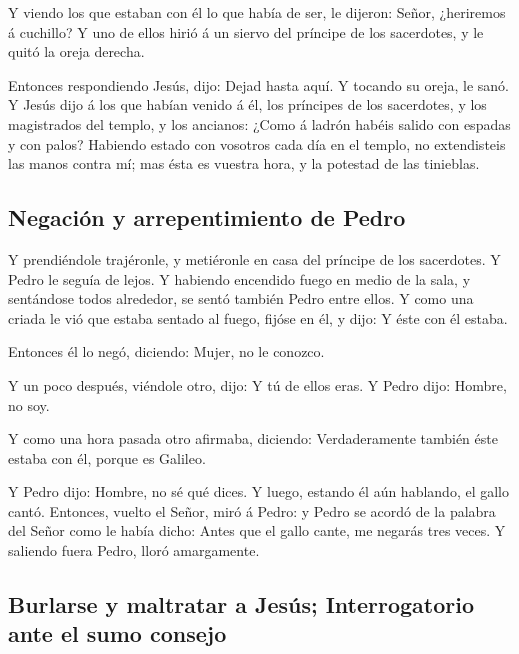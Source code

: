  Y viendo los que estaban con él lo que había de ser, le
dijeron: Señor, ¿heriremos á cuchillo?  Y uno de ellos
hirió á un siervo del príncipe de los sacerdotes, y le quitó la oreja
derecha.

 Entonces respondiendo Jesús, dijo: Dejad hasta aquí. Y
tocando su oreja, le sanó.  Y Jesús dijo á los que habían
venido á él, los príncipes de los sacerdotes, y los magistrados del
templo, y los ancianos: ¿Como á ladrón habéis salido con espadas y con
palos?  Habiendo estado con vosotros cada día en el
templo, no extendisteis las manos contra mí; mas ésta es vuestra hora, y
la potestad de las tinieblas.

\hypertarget{negaciuxf3n-y-arrepentimiento-de-pedro}{%
\subsection{Negación y arrepentimiento de
Pedro}\label{negaciuxf3n-y-arrepentimiento-de-pedro}}

 Y prendiéndole trajéronle, y metiéronle en casa del
príncipe de los sacerdotes. Y Pedro le seguía de lejos. 
Y habiendo encendido fuego en medio de la sala, y sentándose todos
alrededor, se sentó también Pedro entre ellos.  Y como
una criada le vió que estaba sentado al fuego, fijóse en él, y dijo: Y
éste con él estaba.

 Entonces él lo negó, diciendo: Mujer, no le conozco.

 Y un poco después, viéndole otro, dijo: Y tú de ellos
eras. Y Pedro dijo: Hombre, no soy.

 Y como una hora pasada otro afirmaba, diciendo:
Verdaderamente también éste estaba con él, porque es Galileo.

 Y Pedro dijo: Hombre, no sé qué dices. Y luego, estando
él aún hablando, el gallo cantó.  Entonces, vuelto el
Señor, miró á Pedro: y Pedro se acordó de la palabra del Señor como le
había dicho: Antes que el gallo cante, me negarás tres veces.
 Y saliendo fuera Pedro, lloró amargamente.

\hypertarget{burlarse-y-maltratar-a-jesuxfas-interrogatorio-ante-el-sumo-consejo}{%
\subsection{Burlarse y maltratar a Jesús; Interrogatorio ante el sumo
consejo}\label{burlarse-y-maltratar-a-jesuxfas-interrogatorio-ante-el-sumo-consejo}}

